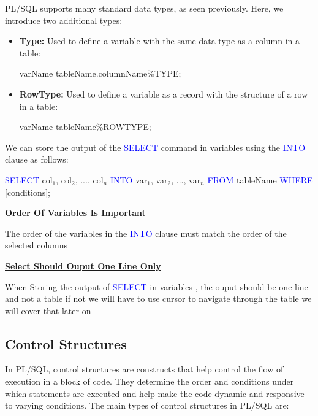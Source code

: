 \begin{tcolorbox}[title = Types]
PL/SQL supports many standard data types, as seen previously. Here, we introduce two additional types:

\begin{itemize}
    \item \textbf{Type:} Used to define a variable with the same data type as a column in a table:
        \begin{center}
            varName tableName.columnName\%TYPE;
        \end{center}
    \item \textbf{RowType:} Used to define a variable as a record with the structure of a row in a table:
        \begin{center}
            varName tableName\%ROWTYPE;
        \end{center}
\end{itemize}

\end{tcolorbox}



\begin{tcolorbox}[title = Store Select Output In Variables]
We can store the output of the \textcolor{blue}{SELECT} command in variables using the \textcolor{blue}{INTO} clause as follows:

\begin{center}
\textcolor{blue}{SELECT} col$_{1}$, col$_{2}$, ..., col$_{n}$ 
\textcolor{blue}{INTO} var$_{1}$, var$_{2}$, ..., var$_{n}$ 
\textcolor{blue}{FROM} tableName 
\textcolor{blue}{WHERE} [conditions];
\end{center}

\end{tcolorbox}
\begin{tcolorbox}[title = Note]
\textbf{\underline{Order Of Variables Is Important}}

The order of the variables in the \textcolor{blue}{INTO} clause must match the order of the selected columns

\textbf{\underline{Select Should Ouput One Line Only}}

When Storing the output of \textcolor{blue}{SELECT} in variables , the ouput should be one line and not a table
if not we will have to use cursor to navigate through the table we will cover that later on
\end{tcolorbox}
\subsection{Control Structures}
\begin{tcolorbox}[title = Definition]
In PL/SQL, control structures are constructs that help control the flow of execution in a block of code.
They determine the order and conditions under which statements are executed and help make the code dynamic
and responsive to varying conditions. The main types of control structures in PL/SQL are:
\end{tcolorbox}

